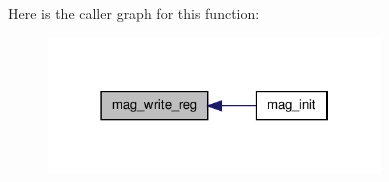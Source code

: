 Here is the caller graph for this function\-:
\nopagebreak
\begin{figure}[H]
\begin{center}
\leavevmode
\includegraphics[width=250pt]{group__imu_gab5d0ae421cd4bb10b1b7a1eda167416b_icgraph}
\end{center}
\end{figure}


